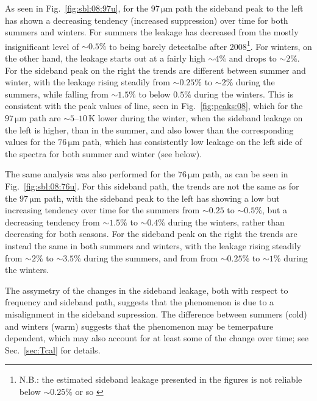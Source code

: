 As seen in Fig.~\ref{fig:sbl:08:97u}, for the $97\,\mathrm{\mu m}$ path the
sideband peak to the left has shown a decreasing tendency (increased
suppression) over time for both summers and winters. For summers the
leakage has decreased from the mostly insignificant level of $\sim0.5\%$ to
being barely detectalbe after 2008\footnote{N.B.: the estimated sideband
leakage presented in the figures is not reliable below $\sim0.25\%$ or so
\label{fn:sblestimate}}. For winters, on the other hand, the leakage starts out
at a fairly high $\sim4\%$ and drops to $\sim2\%$. For the sideband peak on the
right the trends are different between summer and winter, with the leakage
rising steadily from $\sim0.25\%$ to $\sim2\%$ during the summers, while
falling from $\sim1.5\%$ to below $0.5\%$ during the
winters. This is consistent with the peak values of
 line, seen in Fig.~\ref{fig:peaks:08}, which for the
$97\,\mathrm{\mu m}$ path are $\sim5$--$10\,\mathrm{K}$ lower during the
winter, when the sideband leakage on the left is higher, than in the summer,
and also lower than the corresponding values for the $76\,\mathrm{\mu m}$ path,
which has consistently low leakage on the left side of the spectra for both
summer and winter (see below).

The same analysis was also performed for the $76\,\mathrm{\mu m}$ path, as can
be seen in Fig.~\ref{fig:sbl:08:76u}.  For this sideband path, the trends are
not the same as for the $97\,\mathrm{\mu m}$ path, with the sideband peak to
the left has showing a low but increasing tendency over time for the summers
from $\sim0.25$ to $\sim0.5\%$, but a decreasing tendency from $\sim1.5\%$ to
$\sim0.4\%$ during the winters, rather than decreasing
for both seasons. For the sideband peak on the right the trends are instead the
same in both summers and winters, with the leakage
rising steadily from $\sim2\%$ to $\sim3.5\%$ during the summers, and from
from $\sim0.25\%$ to $\sim1\%$ during the winters.

The assymetry of the changes in the sideband leakage, both with respect to
frequency and sideband path, suggests that the phenomenon is due to a
misalignment in the sideband supression.  The difference between summers (cold)
and winters (warm) suggests that the phenomenon may be temerpature dependent,
which may also account for at least some of the change over time; see
Sec.~\ref{sec:Tcal} for details.

